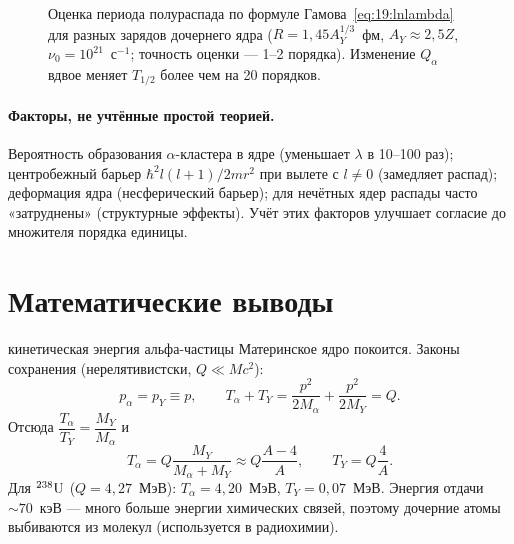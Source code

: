 \begin{figure}[htbp]
\centering
{}
\caption{Оценка периода полураспада по формуле Гамова~\eqref{eq:19:lnlambda} для разных зарядов дочернего ядра
($R=1{,}45A_Y^{1/3}$~фм, $A_Y\approx2{,}5Z$, $\nu_0=10^{21}$~с$^{-1}$; точность оценки — 1--2 порядка). Изменение $Q_\alpha$ вдвое
меняет $T_{1/2}$ более чем на 20 порядков.}
\label{fig:19:GN}
\end{figure}

\paragraph{Факторы, не учтённые простой теорией.} Вероятность образования $\alpha$-кластера в ядре (уменьшает $\lambda$ в 10--100 раз);
центробежный барьер $\hbar^2l(l+1)/2mr^2$ при вылете с $l\neq0$ (замедляет распад); деформация ядра (несферический барьер);
для нечётных ядер распады часто «затруднены» (структурные эффекты). Учёт этих факторов улучшает согласие до множителя
порядка единицы.

\section{Математические выводы}

\begin{derivation}[label=der:19:Talpha]{кинетическая энергия альфа-частицы}
Материнское ядро покоится. Законы сохранения (нерелятивистски, $Q\ll Mc^2$):
\[
  p_\alpha=p_Y\equiv p,\qquad T_\alpha+T_Y=\frac{p^2}{2M_\alpha}+\frac{p^2}{2M_Y}=Q .
\]
Отсюда $\dfrac{T_\alpha}{T_Y}=\dfrac{M_Y}{M_\alpha}$ и
\[
  T_\alpha=Q\frac{M_Y}{M_\alpha+M_Y}\approx Q\frac{A-4}{A},\qquad T_Y=Q\frac{4}{A}.
\]
Для $\nucl{U}{238}$ ($Q=4{,}27$~МэВ): $T_\alpha=4{,}20$~МэВ, $T_Y=0{,}07$~МэВ. Энергия отдачи $\sim70$~кэВ — много больше энергии
химических связей, поэтому дочерние атомы выбиваются из молекул (используется в радиохимии).
\end{derivation}

